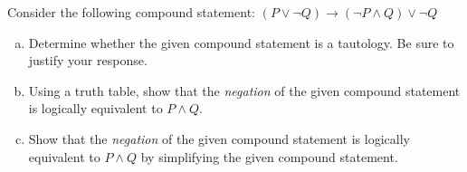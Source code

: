 \documentclass[11pt,letterpaper]{article}
\begin{document}
\newpage



 Consider the following compound statement: $(P \vee \neg Q) \to (\neg P \wedge Q) \vee \neg Q$
	\begin{enumerate}[(a)]
	\item Determine whether the given compound statement is a tautology. Be sure to justify your response. 
	\item Using a truth table, show that the \textit{negation} of the given compound statement is logically equivalent to $P \wedge Q$. 
	\item Show that the \textit{negation} of the given compound statement is logically equivalent to $P \wedge Q$ by simplifying the given compound statement.
	\end{enumerate} 
\end{document}
